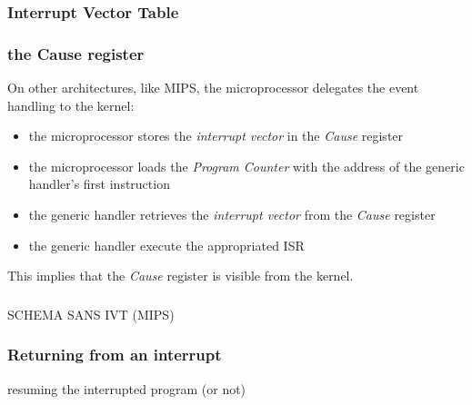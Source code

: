 %
%
%

\begin{frame}
  \frametitle{Interrupt Vector Table}

  \begin{center}
  \end{center}

\end{frame}

%
%
%

\begin{frame}
  \frametitle{the Cause register}

  On other architectures, like MIPS, the microprocessor delegates the event
  handling to the kernel:

  \-

  \begin{itemize}
    \item the microprocessor stores the {\em interrupt vector} in the
    {\em Cause} register
    \item the microprocessor loads the {\em Program Counter} with the
      address of the generic handler's first instruction
    \item the generic handler retrieves the {\em interrupt vector} from
      the {\em Cause} register
    \item the generic handler execute the appropriated ISR
  \end{itemize}

  \-

  This implies that the {\em Cause} register is visible from the kernel.
\end{frame}


%
%
%

\begin{frame}
  \frametitle{}

  SCHEMA SANS IVT (MIPS)

\end{frame}

%
%
%

\begin{frame}
  \frametitle{Returning from an interrupt}

  resuming the interrupted program (or not)


\end{frame}

%
%
%

